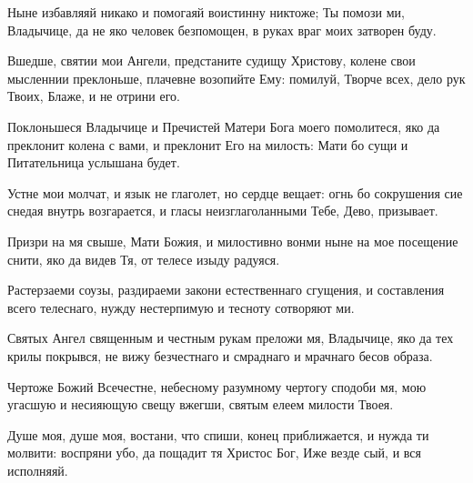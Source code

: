\begin{mymulticols}

Ныне избавляяй никако и помогаяй воистинну никтоже; Ты помози ми, Владычице, да не яко человек безпомощен, в руках враг моих затворен буду. 

\slavan

Вшедше, святии мои Ангели, предстаните судищу Христову, колене свои мысленнии преклоньше, плачевне возопийте Ему: помилуй, Творче всех, дело рук Твоих, Блаже, и не отрини его. 

\inynen

 Поклоньшеся Владычице и Пречистей Матери Бога моего помолитеся, яко да преклонит колена с вами, и преклонит Его на милость: Мати бо сущи и Питательница услышана будет.




Устне мои молчат, и язык не глаголет, но сердце вещает: огнь бо сокрушения сие снедая внутрь возгарается, и гласы неизглаголанными Тебе, Дево, призывает. 


Призри на мя свыше, Мати Божия, и милостивно вонми ныне на мое посещение снити, яко да видев Тя, от телесе изыду радуяся. 


Растерзаеми соузы, раздираеми закони естественнаго сгущения, и составления всего телеснаго, нужду нестерпимую и тесноту сотворяют ми. 

\slavan

Святых Ангел священным и честным рукам преложи мя, Владычице, яко да тех крилы покрывся, не вижу безчестнаго и смраднаго и мрачнаго бесов образа. 

\inynen

 Чертоже Божий Всечестне, небесному разумному чертогу сподоби мя, мою угасшую и несияющую свещу вжегши, святым елеем милости Твоея.


Душе моя, душе моя, востани, что спиши, конец приближается, и нужда ти молвити: воспряни убо, да пощадит тя Христос Бог, Иже везде сый, и вся исполняяй. 



\end{mymulticols}
